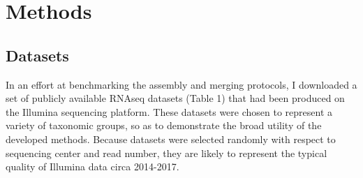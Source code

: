 \documentclass[10pt,letterpaper]{article}
\begin{document}


\section{Methods}

\subsection{Datasets}

In an effort at benchmarking the assembly and merging protocols, I downloaded a set of publicly available RNAseq datasets (Table 1) that had been produced on the Illumina sequencing platform. These datasets were chosen to represent a variety of taxonomic groups, so as to demonstrate the broad utility of the developed methods. Because datasets were selected randomly with respect to sequencing center and read number, they are likely to represent the typical quality of Illumina data circa 2014-2017. 
\end{document}
